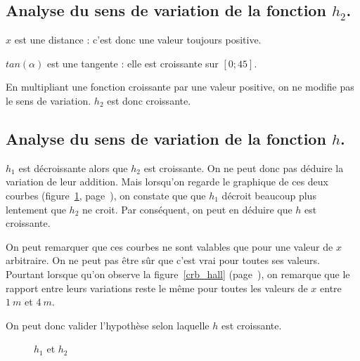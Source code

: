 \subsection{Analyse du sens de variation de la fonction $h_2$.}
$x$ est une distance : c'est donc une valeur toujours positive.

$tan(\alpha)$ est une tangente : elle est croissante sur $[0;45]$.

En multipliant une fonction croissante par une valeur positive, on ne modifie pas le sens de variation. $h_2$ est donc croissante.

\subsection{Analyse du sens de variation de la fonction $h$.}
$h_1$ est décroissante alors que $h_2$ est croissante. On ne peut donc pas déduire la variation de leur addition. Mais lorsqu'on regarde le graphique de ces deux courbes (figure~\ref{crb_hs}, page~\pageref{crb_hs}), on constate que que $h_1$ décroit beaucoup plus lentement que $h_2$ ne croit. Par conséquent, on peut en déduire que $h$ est croissante.

On peut remarquer que ces courbes ne sont valables que pour une valeur de $x$ arbitraire. On ne peut pas être sûr que c'est vrai pour toutes ses valeurs. Pourtant lorsque qu'on observe la figure~\ref{crb_hall} (page~\pageref{crb_hall}), on remarque que le rapport entre leurs variations reste le même pour toutes les valeurs de $x$ entre $1\ m$ et $4\ m$.

On peut donc valider l'hypothèse selon laquelle $h$ est croissante.

\begin{figure}
	\begin{center}
	\end{center}
	\caption{$h_1$ et $h_2$}
	\label{crb_hs}
\end{figure}

